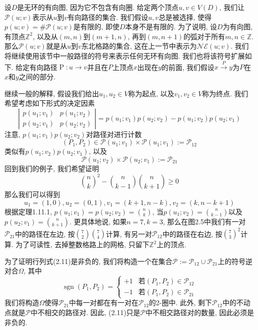 \documentclass{ctexbook}
\begin{document}
	设$D$是无环的有向图, 因为它不包含有向圈. 给定两个顶点$u,v\in V(D)$, 我们让$\mathcal{P}(u;v)$表示从$u$到$v$有向路径的集合. 我们假设$u,v$总是被选择, 使得$p(u;v)=\# \mathcal{P}(u;v)$是有限的, 即使$D$本身不是有限的. 为了说明, 设$D$为有向图, 有顶点$\mathbb{Z}^{2}$, 以及从$(m,n)$到$(m+1,n)$, 再到$(m,n+1)$的弧对于所有$m,n\in \mathbb{Z}$. 那么$\mathcal{P}(u;v)$就是从$u$到$v$东北格路的集合, 这在上一节中表示为$\mathcal{N} \mathcal{E}(u;v)$. 我们将继续使用该节中一般路径的符号来表示任何无环有向图. 我们也将该符号扩展如下. 给定有向路径$\operatorname{P}:u\rightarrow v$并且在$P$上顶点$x$出现在$y$的前面, 我们假设$x\stackrel{P}{\rightarrow} y$为$P$在$x$和$y$之间的部分.

	继续一般的解释, 假设我们给出$u_{1},u_{2}\in V$称为起点, 以及$v_{1},v_{2}\in V$称为终点. 我们希望考虑如下形式的决定因素
\begin{equation}
\left|\begin{array}{cc} p(u_{1};v_{1}) & p(u_{1};v_{2}) \\
p(u_{2};v_{1}) & p(u_{2};v_{2})
\end{array}\right| =p(u_{1};v_{1})p(u_{2};v_{2})-p(u_{1};v_{2})p(u_{2};v_{1})
\end{equation}
	注意, $p(u_{1};v_{1})p(u_{2};v_{2})$对路径对进行计数
\[
	(P_{1},P_{2})\in \mathcal{P}(u_{1};v_{1}) \times \mathcal{P}(u_{1};v_{1}):=\mathcal{P}_{12}
\]
	类似有$p(u_{1};v_{2})p(u_{2};v_{1})$, 以及
\[
	\mathcal{P}(u_{1};v_{2}) \times \mathcal{P}(u_{2};v_{1}):=\mathcal{P}_{21}
\]
	回到我们的例子, 我们希望证明
\[
	\binom{n}{k}^{2}-\binom{n}{k-1}\binom{n}{k+1} \geq 0
\]
	那么我们可以得到
\[
	u_{1}=(1,0),u_{2}=(0,1),v_{1}=(k+1,n-k),v_{2}=(k,n-k+1)
\]
	根据定理1.11.1, $p(u_{1};v_{1})=p(u_{2};v_{2})=\binom{n}{k}$, 当$p(u_{1};v_{2})=\binom{n}{k-1}$以及$p(u_{2};v_{1})=\binom{n}{k+1}$. 更具体地说, 如果$n=7,k=3$, 那么在图2.5中我们有一对$\mathcal{P}_{21}$中的路径在左边, 按$\binom{7}{2} \binom{7}{4}$计算, 有另一对$\mathcal{P}_{12}$中的路径在右边, 按$\binom{7}{3}^{2}$计算. 为了可读性, 去掉整数格路上的网格, 只留下$\mathbb{Z}^{2}$上的顶点.

	为了证明行列式(2.11)是非负的, 我们将构造一个在集合$\mathcal{P}:=\mathcal{P}_{12}\cup \mathcal{P}_{21}$上的符号逆对合$\Omega$, 其中
\[
\operatorname{sgn} \left(P_{1},P_{2}\right)=\left\{\begin{array}{cc}
	+1 & \text{若}\left(P_{1},P_{2}\right) \in \mathcal{P}_{12} \\
	-1 & \text{若}\left(P_{1},P_{2}\right) \in \mathcal{P}_{21}
\end{array}\right.
\]
	我们将构造$\Omega$使得$\mathcal{P}_{21}$中每一对都在有一对在$\mathcal{P}_{12}$的2-圈中. 此外, 剩下$\mathcal{P}_{12}$中的不动点就是$\mathcal{P}$中不相交的路径对. 因此, (2.11)只是$\mathcal{P}$中不相交路径对的数量, 因此必须是非负的.
\end{document}
